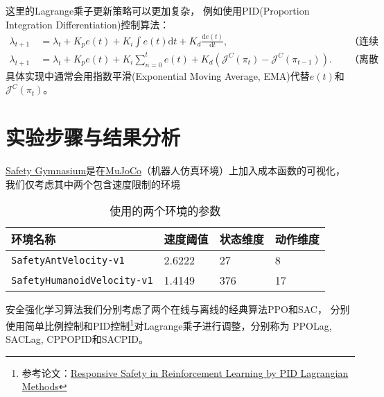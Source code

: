 \documentclass[12pt, a4paper, oneside]{ctexart}
\numberwithin{equation}{section}  %
\def\d{\mathrm{d}}          %
\def\J{\mathcal{J}}
\begin{document}
这里的Lagrange乘子更新策略可以更加复杂，
例如使用PID(Proportion Integration Differentiation)控制算法：
\begin{equation}
    \begin{aligned}
\lambda_{t+1} &\ = \lambda_t + K_p e(t) + K_i \int e(t) \d t + K_d \frac{\d e(t)}{\d t},&\quad\text{（连续形式）}\\
\lambda_{t+1} &\ = \lambda_t + K_p e(t) + K_i \sum_{n=0}^{t}e(t) + K_d \left(\J^C(\pi_t) - \J^C(\pi_{t-1})\right).&\quad\text{（离散形式）}
    \end{aligned}
\end{equation}
具体实现中通常会用指数平滑(Exponential Moving Average, EMA)代替$e(t)$和$\J^C(\pi_t)$。
\section{实验步骤与结果分析}
\href{https://github.com/PKU-Alignment/safety-gymnasium}{Safety Gymnasium}是在\href{https://mujoco.org/}{MuJoCo}（机器人仿真环境）上加入成本函数的可视化，
我们仅考虑其中两个包含速度限制的环境
\renewcommand\arraystretch{1.2} %
\begin{table}[H] %
    \centering %
    \begin{tabular}{p{}<{\centering}p{}<{\centering}p{}<{\centering}p{}<{\centering}} %
        \toprule
        环境名称&速度阈值&状态维度&动作维度\\
        \midrule
        \texttt{SafetyAntVelocity-v1}&2.6222&27&8\\
        \texttt{SafetyHumanoidVelocity-v1}&1.4149&376&17\\
        \bottomrule
    \end{tabular}
    \caption{使用的两个环境的参数}
    \label{table-id}
\end{table}
安全强化学习算法我们分别考虑了两个在线与离线的经典算法PPO和SAC，
分别使用简单比例控制和PID控制\footnote{参考论文：\href{https://arxiv.org/abs/2007.03964}{Responsive Safety in Reinforcement Learning by PID Lagrangian Methods}}对Lagrange乘子进行调整，分别称为
PPOLag, SACLag, CPPOPID和SACPID。
\renewcommand\arraystretch{1.2} %
\end{document}

